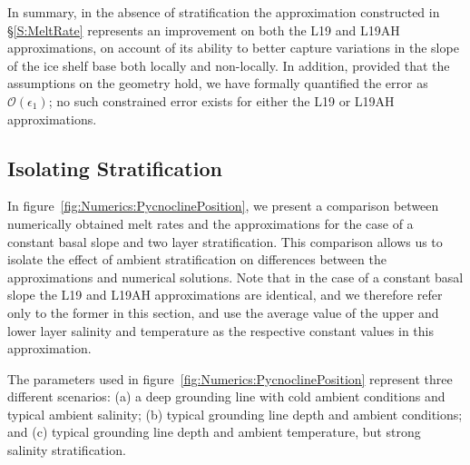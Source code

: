 \documentclass[openacc]{rsproca_new}%
\newcommand{\order}[1]{\mathcal{O}(#1)}
\newcommand{\epsone}{\epsilon_{1}} %
\begin{document}
In summary, in the absence of stratification the approximation constructed in \S\ref{S:MeltRate} represents an improvement on both the L19 and L19AH approximations, on account of its ability to better capture variations in the slope of the ice shelf base both locally and non-locally. In addition, provided that the assumptions on the geometry hold, we have formally quantified the error as $\order{\epsone}$; no such constrained error exists for either the L19 or L19AH approximations. 

\subsection{Isolating Stratification}
In figure~\ref{fig:Numerics:PycnoclinePosition}, we present a comparison between numerically obtained melt rates and the approximations for the case of a constant basal slope and two layer stratification. This comparison allows us to isolate the effect of ambient stratification on differences between the approximations and numerical solutions. Note that in the case of a constant basal slope the L19 and L19AH approximations are identical, and we therefore refer only to the former in this section, and use the average value of the upper and lower layer salinity and temperature as the respective constant values in this approximation.

The parameters used in figure~\ref{fig:Numerics:PycnoclinePosition} represent three different scenarios: (a) a deep grounding line with cold ambient conditions and typical ambient salinity; (b) typical grounding line depth and ambient conditions; and (c) typical grounding line depth and ambient temperature, but strong salinity stratification.
\end{document}
